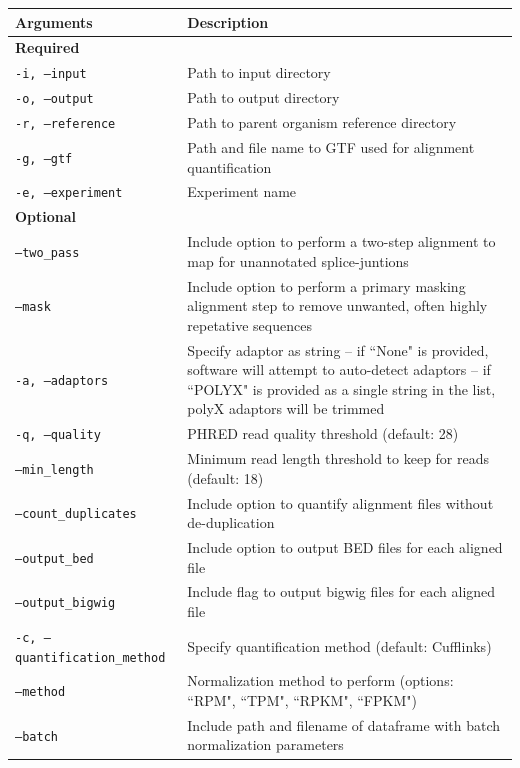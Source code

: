 \documentclass[11pt, a4paper, oneside]{article}
\begin{document}
\begin{tabular}{p{5cm}p{13cm}}
 \textbf{Arguments} & \textbf{Description} \\
 \hline
 \textbf{Required} & \\
 \hline
 \texttt{-i, --input} & Path to input directory \\
 \hline
 \texttt{-o, --output} & Path to output directory \\
 \hline
 \texttt{-r, --reference} & Path to parent organism reference directory \\
 \hline
 \texttt{-g, --gtf} & Path and file name to GTF used for alignment quantification \\
 \hline
 \texttt{-e, --experiment} & Experiment name \\
 \hline
 \textbf{Optional} & \\
 \hline
 \texttt{--two\_pass} & Include option to perform a two-step alignment to map for unannotated splice-juntions \\
 \hline
 \texttt{--mask} & Include option to perform a primary masking alignment step to remove unwanted, often highly repetative sequences \\
 \hline
 \texttt{-a, --adaptors} & Specify adaptor as string -- if ``None" is provided, software will attempt to auto-detect adaptors -- if ``POLYX" is provided as a single string in the list, polyX adaptors will be trimmed \\
 \hline
 \texttt{-q, --quality} & PHRED read quality threshold (default: 28) \\
 \hline
 \texttt{--min\_length} & Minimum read length threshold to keep for reads (default: 18) \\
 \hline
 \texttt{--count\_duplicates} & Include option to quantify alignment files without de-duplication \\
 \hline
 \texttt{--output\_bed} & Include option to output BED files for each aligned file \\
 \hline
 \texttt{--output\_bigwig} & Include flag to output bigwig files for each aligned file \\
 \hline
 \texttt{-c, --quantification\_method} & Specify quantification method (default: Cufflinks\cite{cufflinks}) \\
 \hline
 \texttt{--method} & Normalization method to perform (options: ``RPM", ``TPM", ``RPKM", ``FPKM") \\
 \hline
 \texttt{--batch} & Include path and filename of dataframe with batch normalization parameters \\

\end{tabular}
\end{document}
